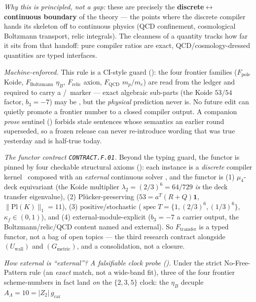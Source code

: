 \documentclass[11pt,a4paper]{article}
\begin{document}
\begin{gapbox}
\smallskip
\noindent\emph{Why this is principled, not a gap:} these are precisely the \textbf{discrete$\leftrightarrow$
continuous boundary} of the theory --- the points where the discrete compiler hands its skeleton off to
continuous physics (QCD confinement, cosmological Boltzmann transport, relic integrals). The cleanness of a
quantity tracks how far it sits from that handoff: pure compiler ratios are exact, QCD/cosmology-dressed
quantities are typed interfaces. 
\par\smallskip\noindent\emph{Machine-enforced.} This rule is a CI-style guard
(): the four frontier families
($F_{\mathrm{pole}}$ Koide, $F_{\mathrm{Boltzmann}}$ $\eta_B$, $F_{\mathrm{relic}}$ axion,
$F_{\mathrm{QCD}}$ $m_p/m_e$) are read from the ledger and required to carry a \mC/\mO\ marker --- exact
algebraic sub-parts (the Koide $53/54$ factor, $b_3=-7$) may be \mE, but the \emph{physical} prediction
never is. No future edit can quietly promote a frontier number to a closed compiler output. A companion
\emph{prose} sentinel () forbids stale sentences whose semantics an
earlier round superseded, so a frozen release can never re-introduce wording that was true yesterday and is
half-true today.
\par\smallskip\noindent\emph{The functor contract \texttt{CONTRACT.F.01}.} Beyond the typing guard, the
functor is pinned by four checkable structural axioms (): each instance is a
\emph{discrete} compiler kernel \mE\ composed with an \emph{external} continuous solver \mC, and the functor
is (1) $\mu_4$-deck equivariant (the Koide multiplier $\lambda_2=(2/3)^6=64/729$ \emph{is} the deck transfer
eigenvalue), (2) Pl\"ucker-preserving ($53=a^T(R{+}Q)\mathbf1$, $\|\mathrm{Pl}(K)\|_1=11$), (3)
positive/stochastic ($\operatorname{spec}T=\{1,(2/3)^6,(1/3)^6\}$, $\kappa_f\in(0,1)$), and (4)
external-module-explicit ($b_3=-7$ a carrier output, the Boltzmann/relic/QCD content named and external). So
$F_{\mathrm{transfer}}$ is a typed functor, not a bag of open topics --- the third research contract alongside
$(U_{\mathrm{wall}})$ and $(G_{\mathrm{metric}})$, and a consolidation, not a closure.
\par\smallskip\noindent\emph{How external is ``external''? A falsifiable clock probe ().}
Under the strict No-Free-Pattern rule (an \emph{exact} match, not a wide-band fit), three of the four frontier
scheme-numbers in fact land \emph{on} the $\{2,3,5\}$ clock: the $\eta_B$ decuple $A_\Lambda=10=|Z_2|\,g_{\mathrm{car}}$

\end{gapbox}
\end{document}
